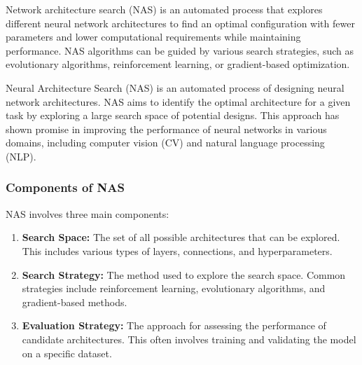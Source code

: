 \documentclass[12pt]{article}
\begin{document}
Network architecture search (NAS) is an automated process that explores different neural network architectures to find an optimal configuration with fewer parameters and lower computational requirements while maintaining performance. NAS algorithms can be guided by various search strategies, such as evolutionary algorithms, reinforcement learning, or gradient-based optimization.

Neural Architecture Search (NAS) is an automated process of designing neural network architectures. NAS aims to identify the optimal architecture for a given task by exploring a large search space of potential designs. This approach has shown promise in improving the performance of neural networks in various domains, including computer vision (CV) and natural language processing (NLP).

\subsubsection{Components of NAS}
NAS involves three main components:
\begin{enumerate}
    \item \textbf{Search Space:} The set of all possible architectures that can be explored. This includes various types of layers, connections, and hyperparameters.
    \item \textbf{Search Strategy:} The method used to explore the search space. Common strategies include reinforcement learning, evolutionary algorithms, and gradient-based methods.
    \item \textbf{Evaluation Strategy:} The approach for assessing the performance of candidate architectures. This often involves training and validating the model on a specific dataset.
\end{enumerate}
\end{document}
